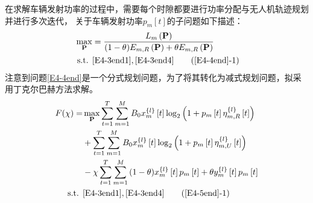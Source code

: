 在求解车辆发射功率的过程中，需要每个时隙都要进行功率分配与无人机轨迹规划并进行多次迭代，
关于车辆发射功率$p_m\left[t\right]$的子问题如下描述：
\begin{align}
\max _{ \mathbf{P}} &   ={\frac{{{L}_{m}}\left( \mathbf{P} \right)}
{(1-\theta){E}_{m,R}\left( \mathbf{P} \right)+\theta{E}_{m,R}\left( \mathbf{P} \right)}}         \label{E4-4end}\\
\text { s.t. }
& \eqref{E4-3end1},\eqref{E4-3end4}                                 \tag{\ref{E4-4end}{-1}}      \label{E4-4end1}
\end{align}
注意到问题\eqref{E4-4end}是一个分式规划问题，为了将其转化为减式规划问题，拟采用丁克尔巴赫方法求解。
\begin{align} \notag
F(\chi)= & \max _{ \mathbf{P}} \sum_{t=1}^T \sum_{m=1}^M {B}_{0}x_{m}^{\left\{ l \right\}}\left[ t \right] %
\log_2{\left(1+p_m\left[t\right]\eta_{m,R}^{\left\{ l \right\}}\left[t\right]\right)}                         \\       \label{E4-5end}
& + \sum_{t=1}^T \sum_{m=1}^M {B}_{0}x_{m}^{\left\{ l \right\}}\left[ t \right]
\log_2{\left(1+p_m\left[t\right]\eta_{m,U}^{\left\{ l \right\}}\left[t\right]\right)}                         \\ \notag
& -\chi \sum_{t=1}^T \sum_{m=1}^M{(1-\theta)x_{m}^{\left\{ l \right\}}\left[ t \right]p_m\left[t\right]
+\theta y_{m}^{\left\{ l \right\}}\left[ t \right]p_m\left[t\right]}                                          \\ \notag
\text { s.t. }
& \eqref{E4-3end1},\eqref{E4-3end4}                                       \tag{\ref{E4-5end}{-1}}                      \label{E4-5end1}
\end{align}

